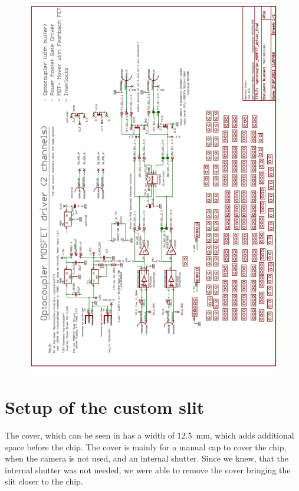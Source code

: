 \begin{figure}[htb]
	\begin{center}
		\includegraphics[width=\textwidth]{drafts/shutter_circuit.pdf}
	\end{center}
	\label{fig:cam_drawing}
\end{figure}

\chapter{Setup of the custom slit}


The cover, which can be seen in  has a width of \SI{12.5}{\milli\meter}, which adds additional space before the chip. The cover is mainly for a manual cap to cover the chip, when the camera is not used, and an internal shutter. Since we knew, that the internal shutter was not needed, we were able to remove the cover bringing the slit closer to the chip.


